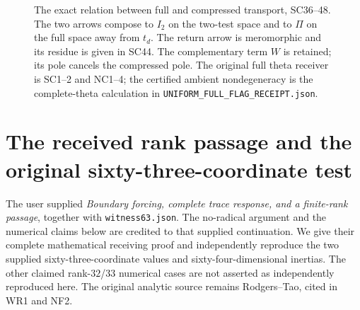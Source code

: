 \documentclass[11pt,a4paper]{article}
\theoremstyle{definition}\newtheorem{definition}[theorem]{Definition}
\begin{document}
\begin{figure}[p]
\centering
{}
\caption{The exact relation between full and compressed transport,
SC36--48. The two arrows compose to \(I_2\) on the two-test
space and to \(\Pi\) on the full space away from \(t_d\).
The return arrow is meromorphic and its residue is given in
SC44. The complementary term \(W\) is retained; its pole
cancels the compressed pole. The original full theta receiver
is SC1--2 and NC1--4; the certified ambient nondegeneracy is
the complete-theta calculation in
\texttt{UNIFORM\_FULL\_FLAG\_RECEIPT.json}.}
\label{fig:ambient-compressed-cancellation}
\end{figure}

\clearpage
\section{The received rank passage and the original sixty-three-coordinate test}

The user supplied \emph{Boundary forcing, complete trace response,
and a finite-rank passage}, together with \texttt{witness63.json}.
The no-radical argument and the numerical claims below are credited
to that supplied continuation. We give their complete mathematical
receiving proof and independently reproduce the two supplied
sixty-three-coordinate values and sixty-four-dimensional inertias.
The other claimed rank-$32$/$33$ numerical cases are not asserted
as independently reproduced here. The original analytic source
remains Rodgers--Tao, cited in WR1 and NF2.
\end{document}
